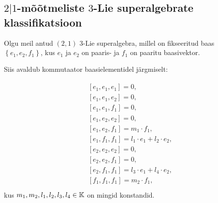 
\subsection{\texorpdfstring{$2|1$}{1|2}-mõõtmeliste \texorpdfstring{$3$}{3}-Lie superalgebrate klassifikatsioon}

Olgu meil antud $(2, 1)$ 3-Lie superalgebra, millel on fikseeritud baas
$\left\{ e_1, e_2, f_1 \right\}$, kus $e_1$ ja $e_2$ on paaris- ja
$f_1$ on paaritu baasivektor.

Siis avaldub kommutaator baasielementidel järgmiselt:

\begin{align}\label{samasused:2-1}
    \begin{split}
        & \left[e_1, e_1, e_1\right] = 0, \\
        & \left[e_1, e_1, e_2\right] = 0, \\
        & \left[e_1, e_1, f_1\right] = 0, \\
        & \left[e_1, e_2, e_2\right] = 0, \\
        & \left[e_1, e_2, f_1\right] = m_1 \cdot f_1, \\
        & \left[e_1, f_1, f_1\right] = l_1 \cdot e_1 + l_2 \cdot e_2, \\
        & \left[e_2, e_2, e_2\right] = 0, \\
        & \left[e_2, e_2, f_1\right] = 0, \\
        & \left[e_2, f_1, f_1\right] = l_3 \cdot e_1 + l_4 \cdot e_2, \\
        & \left[f_1, f_1, f_1\right] = m_2 \cdot f_1, \\
    \end{split}
\end{align}
kus $m_1, m_2, l_1, l_2, l_3, l_4 \in \mathbb{K}$ on mingid konstandid.


